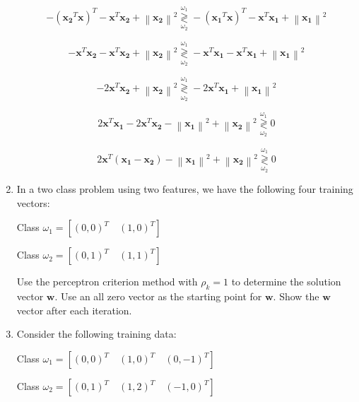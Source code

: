 \documentclass[fleqn]{article}
\newcommand{\norm}[1]{\left \lVert #1 \right \rVert}
\begin{document}
\begin{enumerate}
		\begin{equation*}
			- (\mathbf{x_2}^T\mathbf{x})^T - \mathbf{x}^T\mathbf{x_2} + \norm{\mathbf{x_2}}^2 \overset{\omega_1}{\underset{\omega_2}{\gtrless}} - (\mathbf{x_1}^T\mathbf{x})^T - \mathbf{x}^T\mathbf{x_1} + \norm{\mathbf{x_1}}^2
		\end{equation*}
		
		\begin{equation*}
			- \mathbf{x}^T\mathbf{x_2} - \mathbf{x}^T\mathbf{x_2} + \norm{\mathbf{x_2}}^2 \overset{\omega_1}{\underset{\omega_2}{\gtrless}} - \mathbf{x}^T\mathbf{x_1} - \mathbf{x}^T\mathbf{x_1} + \norm{\mathbf{x_1}}^2
		\end{equation*}
		
		\begin{equation*}
			- 2\mathbf{x}^T\mathbf{x_2} + \norm{\mathbf{x_2}}^2 \overset{\omega_1}{\underset{\omega_2}{\gtrless}} - 2\mathbf{x}^T\mathbf{x_1} + \norm{\mathbf{x_1}}^2
		\end{equation*}
		
		\begin{equation*}
			2\mathbf{x}^T\mathbf{x_1} - 2\mathbf{x}^T\mathbf{x_2} - \norm{\mathbf{x_1}}^2 + \norm{\mathbf{x_2}}^2 \overset{\omega_1}{\underset{\omega_2}{\gtrless}} 0
		\end{equation*}
		
		\begin{equation*}
			2\mathbf{x}^T(\mathbf{x_1} - \mathbf{x_2}) - \norm{\mathbf{x_1}}^2 + \norm{\mathbf{x_2}}^2 \overset{\omega_1}{\underset{\omega_2}{\gtrless}} 0
		\end{equation*}
		
		\item In a two class problem using two features, we have the following four training vectors:
		
		Class $\omega_1 = [(0,0)^T\quad(1,0)^T]$
		
		Class $\omega_2 = [(0,1)^T\quad(1,1)^T]$
		
		Use the perceptron criterion method with $\rho_k = 1$ to determine the solution vector $\mathbf{w}$. Use an all zero vector as the starting point for $\mathbf{w}$. Show the $\mathbf{w}$ vector after each iteration.
		
		\item Consider the following training data:
		
		Class $\omega_1 = [(0,0)^T\quad(1,0)^T\quad(0,-1)^T]$
		
		Class $\omega_2 = [(0,1)^T\quad(1,2)^T\quad(-1,0)^T]$
		

\end{enumerate}
\end{document}
